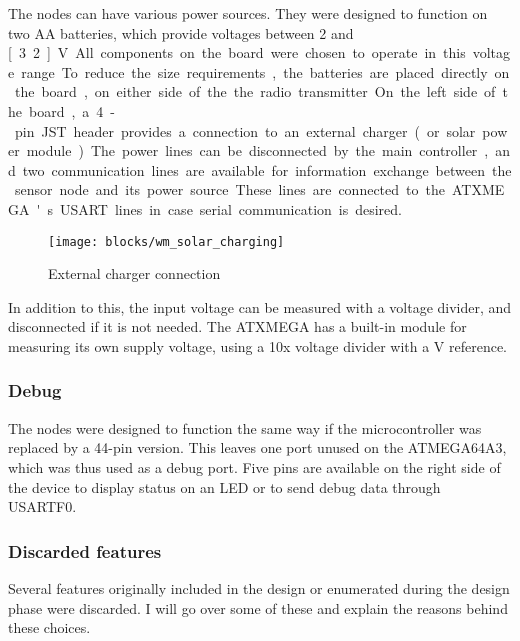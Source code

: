 The nodes can have various power sources. They were designed to function on two
AA batteries, which provide voltages between 2 and \unit[3.2]{V}. All components on
the board were chosen to operate in this voltage range.

To reduce the size requirements, the batteries are placed directly on the board,
on either side of the the radio transmitter.

On the left side of the board, a 4-pin JST header provides a connection to an
external charger (or solar power module). The power lines can be disconnected by
the main controller, and two communication lines are available for information
exchange between the sensor node and its power source. These lines are connected
to the ATXMEGA's USART lines in case serial communication is desired.

\begin{figure}[h]
  \begin{center}
    \texttt{[image: blocks/wm\_solar\_charging]}
  \end{center}
  \caption{External charger connection}
  \label{fig:solar-charger}
\end{figure}

In addition to this, the input voltage can be measured with a voltage divider,
and disconnected if it is not needed. The ATXMEGA has a built-in module for
measuring its own supply voltage, using a 10x voltage divider with a \unit[1]{V}
reference.

\subsubsection{Debug}

The nodes were designed to function the same way if the microcontroller was
replaced by a 44-pin version. This leaves one port unused on the ATMEGA64A3,
which was thus used as a debug port. Five pins are available on the right side
of the device to display status on an LED or to send debug data through USARTF0.

\subsubsection{Discarded features}

Several features originally included in the design or enumerated during the
design phase were discarded. I will go over some of these and explain the
reasons behind these choices.


